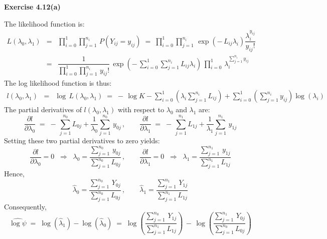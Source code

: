 
\noindent
\textbf{Exercise 4.12(a)}

\vskip 0.3cm
\noindent
The likelihood function is:
\begin{eqnarray*}
L(\lambda_{0},\lambda_{1})
&=&\prod_{i=0}^{1}\prod_{j=1}^{n_{i}}\,P\!\left(Y_{ij} = y_{ij}\right)
\;=\;\prod_{i=0}^{1}\prod_{j=1}^{n_{i}}\,\exp\!\left(-\,L_{ij}\lambda_{i}\right)\dfrac{\lambda_{i}^{y_{ij}}}{y_{ij}!} \\
&=&\dfrac{1}{\prod_{i=0}^{1}\prod_{j=1}^{n_{i}}\,y_{ij}!}
\,\exp\!\left(-\,\sum_{i=0}^{1}\sum_{j=1}^{n_{i}}L_{ij}\lambda_{i}\right)
\,\prod_{i=0}^{1}\,\lambda_{i}^{\sum_{j=1}^{n_{i}}y_{ij}}
\end{eqnarray*}
The log likelihood function is thus:
\begin{eqnarray*}
l(\lambda_{0},\lambda_{1})
&=&\log\,L(\lambda_{0},\lambda_{1})
\;=\;-\,\log K - \sum_{i=0}^{1}\left(\lambda_{i}\sum_{j=1}^{n_{i}}L_{ij}\right)
+ \sum_{i=0}^{1}\left(\sum_{j=1}^{n_{i}}y_{ij}\right)\log(\lambda_{i})
\end{eqnarray*}
The partial derivatives of $l(\lambda_{0},\lambda_{1})$ with respect to $\lambda_{0}$ and $\lambda_{1}$ are:
\begin{equation*}
\dfrac{\partial l}{\partial\lambda_{0}}
\;=\; -\,\sum_{j=1}^{n_{0}}L_{0j} + \dfrac{1}{\lambda_{0}}\sum_{j=1}^{n_{0}}\,y_{0j}\,,
\quad\quad
\dfrac{\partial l}{\partial\lambda_{1}}
\;=\; -\,\sum_{j=1}^{n_{1}}L_{1j} + \dfrac{1}{\lambda_{1}}\sum_{j=1}^{n_{1}}\,y_{1j}
\end{equation*}
Setting these two partial derivatives to zero yields:
\begin{equation*}
\dfrac{\partial l}{\partial\lambda_{0}} = 0
\;\;\Longrightarrow\;\;\lambda_{0} = \dfrac{\sum_{j=1}^{n_{0}}\,y_{0j}}{\sum_{j=1}^{n_{0}}L_{0j}}\,,
\quad\quad
\dfrac{\partial l}{\partial\lambda_{1}} = 0
\;\;\Longrightarrow\;\; \lambda_{1} = \dfrac{\sum_{j=1}^{n_{1}}\,y_{1j}}{\sum_{j=1}^{n_{1}}L_{1j}}
\end{equation*}
Hence,
\begin{equation*}
\widehat{\lambda}_{0} = \dfrac{\sum_{j=1}^{n_{0}}\,Y_{0j}}{\sum_{j=1}^{n_{0}}L_{0j}}\,,
\quad\quad
\widehat{\lambda}_{1} = \dfrac{\sum_{j=1}^{n_{1}}\,Y_{1j}}{\sum_{j=1}^{n_{1}}L_{1j}}
\end{equation*}
Consequently,
\begin{equation*}
\widehat{\log\psi}
\; = \; \log\!\left(\widehat{\lambda}_{1}\right) - \log\!\left(\widehat{\lambda}_{0}\right)
\; = \; \log\!\left(\dfrac{\sum_{j=1}^{n_{0}}\,Y_{1j}}{\sum_{j=1}^{n_{1}}L_{1j}}\right)
\,-\, \log\!\left(\dfrac{\sum_{j=1}^{n_{1}}\,Y_{0j}}{\sum_{j=1}^{n_{0}}L_{0j}}\right)
\end{equation*}
